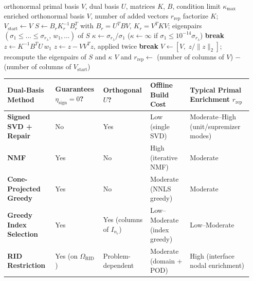 \documentclass[11pt,a4paper]{article}
\begin{document}
\begin{algorithm}[H]\small
\caption{Supremizer rank repair of the primal basis.}\label{alg:repair}
\begin{algorithmic}[1]
\Require orthonormal primal basis $V$, dual basis $U$, matrices $K$, $B$, condition limit $\kappa_{\max}$
\Ensure enriched orthonormal basis $V$, number of added vectors $r_{\mathrm{rep}}$
\State factorize $K$; $V_{\mathrm{start}}\gets V$
\State $S\gets B_rK_r^{-1}B_r^T$ with $B_r=U^TBV$, $K_r=V^TKV$; eigenpairs $(\sigma_1\le\dots\le\sigma_{r_\lambda},\,w_1,\dots)$ of $S$
\State $\kappa\gets\sigma_{r_\lambda}/\sigma_1$ ($\kappa\gets\infty$ if $\sigma_1\le 10^{-14}\sigma_{r_\lambda}$)
  \If{$\kappa\le\kappa_{\max}$} \State \textbf{break} \EndIf
  \State $z\gets K^{-1}B^TU\,w_1$ 
  \State $z\gets z-VV^Tz$, applied twice 
   \State \textbf{break} \EndIf
  \State $V\gets[V,\;z/\|z\|_2]$; recompute the eigenpairs of $S$ and $\kappa$
\EndFor
\State \Return $V$ and $r_{\mathrm{rep}}\gets$ (number of columns of $V$) $-$ (number of columns of $V_{\mathrm{start}}$)
\end{algorithmic}
\end{algorithm}

\begin{longtable}[]{@{}
  >{\raggedright\arraybackslash}p{}
  >{\raggedright\arraybackslash}p{}
  >{\raggedright\arraybackslash}p{}
  >{\raggedright\arraybackslash}p{}
  >{\raggedright\arraybackslash}p{}@{}}
\toprule
Dual-Basis Method & Guarantees \(\eta_{\text{sign}} = 0\)? & Orthogonal \(U\)? & Offline Build Cost & Typical Primal Enrichment \(r_{\text{rep}}\) \\
\midrule
\endhead
\textbf{Signed SVD + Repair} \cite{leberre2022condition} & No & Yes & Low (single SVD) & Moderate--High (unit/supremizer modes) \\
\textbf{NMF} \cite{balajewicz2016projection} & Yes & No & High (iterative NMF) & Moderate \\
\textbf{Cone-Projected Greedy} \cite{benaceur2020reduced} & Yes & No & Moderate (NNLS greedy) & Moderate \\
\textbf{Greedy Index Selection} \cite{sambataro2026model, kollepara2024sparse} & Yes & Yes (columns of \(I_{n_c}\)) & Low--Moderate (index greedy) & Low--Moderate \\
\textbf{RID Restriction} \cite{fauque2018hybrid, leberre2022condition} & Yes (on \(\Omega_{\text{RID}}\)) & Problem-dependent & Moderate (domain + POD) & High (interface nodal enrichment) \\
\bottomrule
\end{longtable}
\end{document}
